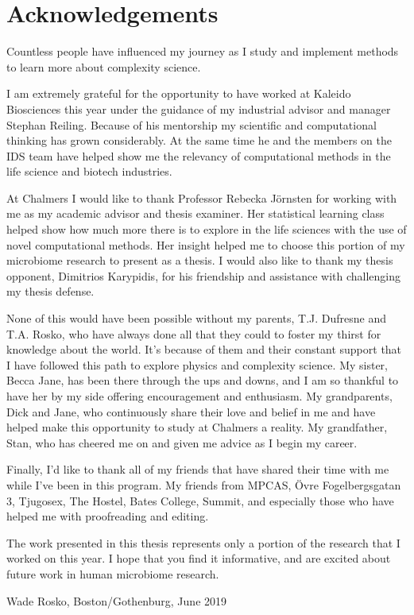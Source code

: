 
\thispagestyle{plain}			%
\section*{Acknowledgements}
Countless people have influenced my journey as I study and implement methods to learn more about complexity science. 
\medskip

I am extremely grateful for the opportunity to have worked at Kaleido Biosciences this year under the guidance of my industrial advisor and manager Stephan Reiling. Because of his mentorship my scientific and computational thinking has grown considerably. At the same time he and the members on the IDS team have helped show me the relevancy of computational methods in the life science and biotech industries. 

\medskip
At Chalmers I would like to thank Professor Rebecka J\"{o}rnsten for working with me as my academic advisor and thesis examiner. Her statistical learning class helped show how much more there is to explore in the life sciences with the use of novel computational methods. Her insight helped me to choose this portion of my microbiome research to present as a thesis. 
I would also like to thank my thesis opponent, Dimitrios Karypidis, for his friendship and assistance with challenging my thesis defense.

\medskip
None of this would have been possible without my parents, T.J. Dufresne and T.A. Rosko, who have always done all that they could to foster my thirst for knowledge about the world. It's because of them and their constant support that I have followed this path to explore physics and complexity science. My sister, Becca Jane, has been there through the ups and downs, and I am so thankful to have her by my side offering encouragement and enthusiasm. My grandparents, Dick and Jane, who continuously share their love and belief in me and have helped make this opportunity to study at Chalmers a reality. My grandfather, Stan, who has cheered me on and given me advice as I begin my career. 

\medskip
Finally, I'd like to thank all of my friends that have shared their time with me while I've been in this program. My friends from MPCAS, \"{O}vre Fogelbergsgatan 3, Tjugosex, The Hostel, Bates College, Summit, and especially those who have helped me with proofreading and editing. 

\medskip

The work presented in this thesis represents only a portion of the research that I worked on this year. I hope that you find it informative, and are excited about future work in human microbiome research. 

\vspace{1.5cm}
\hfill
Wade Rosko, Boston/Gothenburg, June 2019

\newpage				%
\thispagestyle{empty}
\mbox{}
